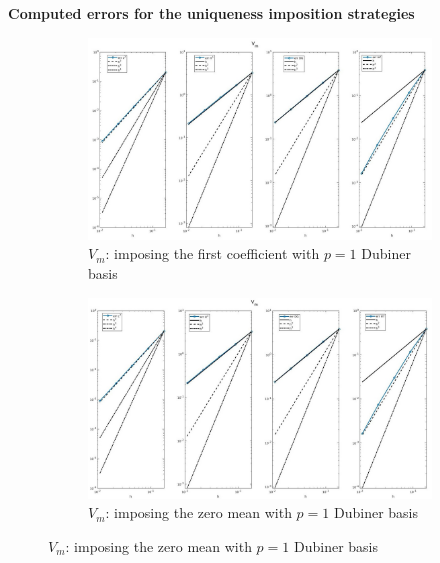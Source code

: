 \documentclass[a4paper,11pt]{article}
\begin{document}
\begin{center}
\textbf{Computed errors for the uniqueness imposition strategies}
\end{center}
\begin{figure}[H]
\caption{Comparison of the trans-membrane potential ($V_m$)}
\label{Vm-unique}
\begin{subfigure}{\textwidth}
\begin{center}
\includegraphics[width = \textwidth]{./D1_Vm_1.jpg}
\caption{$V_m$: imposing the first coefficient with $p=1$ Dubiner basis}
\end{center}
\end{subfigure}
\begin{subfigure}{\textwidth}
\begin{center}
\includegraphics[width =\textwidth]{./D1_Vm_2.jpg}
\caption{$V_m$: imposing the zero mean with $p=1$ Dubiner basis}
\end{center}
\end{subfigure}
\end{figure}
\end{document}
